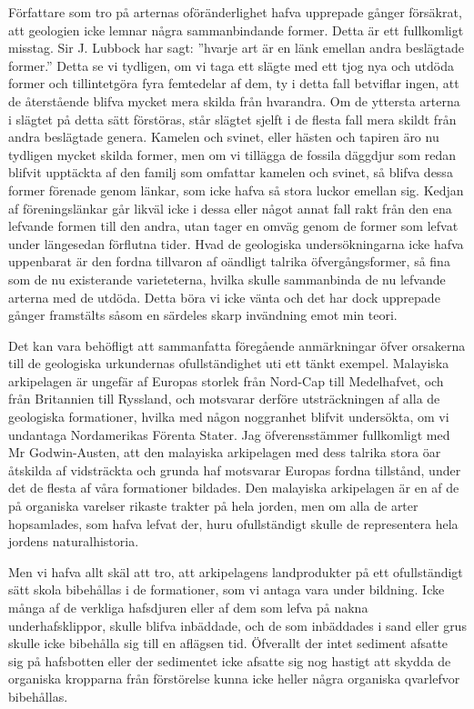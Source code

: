 Författare som tro på arternas oföränderlighet hafva upprepade gånger försäkrat, att geologien icke lemnar några sammanbindande former. Detta är ett fullkomligt misstag. Sir J. Lubbock har sagt: ”hvarje art är en länk emellan andra beslägtade former.” Detta se vi tydligen, om vi taga ett slägte med ett tjog nya och utdöda former och tillintetgöra fyra femtedelar af dem, ty i detta fall betviflar ingen, att de återstående blifva mycket mera skilda från hvarandra. Om de yttersta arterna i slägtet på detta sätt förstöras, står slägtet sjelft i de flesta fall mera skildt från andra beslägtade genera. Kamelen och svinet, eller hästen och tapiren äro nu tydligen mycket skilda former, men om vi tillägga de fossila däggdjur som redan blifvit upptäckta af den familj som omfattar kamelen och svinet, så blifva dessa former förenade genom länkar, som icke hafva så stora luckor emellan sig. Kedjan af föreningslänkar går likväl icke i dessa eller något annat fall rakt från den ena lefvande formen till den andra, utan tager en omväg genom de former som lefvat under längesedan förflutna tider. Hvad de geologiska undersökningarna icke hafva uppenbarat är den fordna tillvaron af oändligt talrika öfvergångsformer, så fina som de nu existerande varieteterna, hvilka skulle sammanbinda de nu lefvande arterna med de utdöda. Detta böra vi icke vänta och det har dock upprepade gånger framstälts såsom en särdeles skarp invändning emot min teori.

Det kan vara behöfligt att sammanfatta föregående anmärkningar öfver orsakerna till de geologiska urkundernas ofullständighet uti ett tänkt exempel. Malayiska arkipelagen är ungefär af Europas storlek från Nord-Cap till Medelhafvet, och från Britannien till Ryssland, och motsvarar derföre utsträckningen af alla de geologiska formationer, hvilka med någon noggranhet blifvit undersökta, om vi undantaga Nordamerikas Förenta Stater. Jag öfverensstämmer fullkomligt med Mr Godwin-Austen, att den malayiska arkipelagen med dess talrika stora öar åtskilda af vidsträckta och grunda haf motsvarar Europas fordna tillstånd, under det de flesta af våra formationer bildades. Den malayiska arkipelagen är en af de på organiska varelser rikaste trakter på hela jorden, men om alla de arter hopsamlades, som hafva lefvat der, huru ofullständigt skulle de representera hela jordens naturalhistoria.

Men vi hafva allt skäl att tro, att arkipelagens landprodukter på ett ofullständigt sätt skola bibehållas i de formationer, som vi antaga vara under bildning. Icke många af de verkliga hafsdjuren eller af dem som lefva på nakna underhafsklippor, skulle blifva inbäddade, och de som inbäddades i sand eller grus skulle icke bibehålla sig till en aflägsen tid. Öfverallt der intet sediment afsatte sig på hafsbotten eller der sedimentet icke afsatte sig nog hastigt att skydda de organiska kropparna från förstörelse kunna icke heller några organiska qvarlefvor bibehållas.


